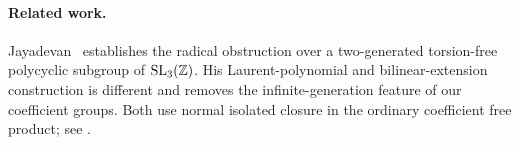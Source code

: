 
\paragraph{Related work.}
Jayadevan~\cite{jayadevan-14-22} establishes the radical obstruction
over a two-generated torsion-free polycyclic subgroup of \(\operatorname{SL}_3(\mathbb Z)\).
His Laurent-polynomial and bilinear-extension construction is different
and removes the infinite-generation feature of our coefficient groups.
Both use normal isolated closure in the ordinary coefficient free product;
see \comparisonlocation{}.
